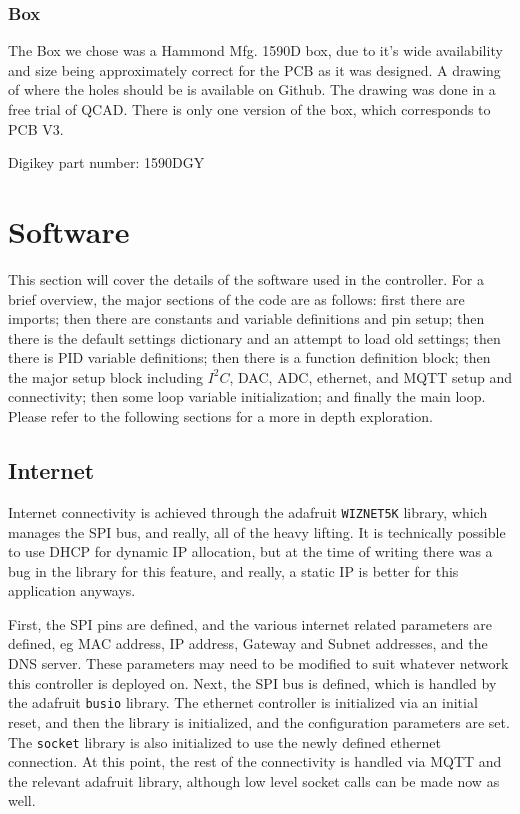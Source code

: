 \documentclass[11pt, letterpaper]{article}
\begin{document}
\subsubsection{Box}

The Box we chose was a Hammond Mfg. 1590D box, due to it's wide availability and size being approximately correct for the PCB as it was designed. A drawing of where the holes should be is available on Github. The drawing was done in a free trial of QCAD. There is only one version of the box, which corresponds to PCB V3.

Digikey part number: 1590DGY

\section{Software}
This section will cover the details of the software used in the controller. For a brief overview, the major sections of the code are as follows: first there are imports; then there are constants and variable definitions and pin setup; then there is the default settings dictionary and an attempt to load old settings; then there is PID variable definitions; then there is a function definition block; then the major setup block including $I^2 C$, DAC, ADC, ethernet, and MQTT setup and connectivity; then some loop variable initialization; and finally the main loop. Please refer to the following sections for a more in depth exploration.

\subsection{Internet}
Internet connectivity is achieved through the adafruit \verb|WIZNET5K| library, which manages the SPI bus, and really, all of the heavy lifting. It is technically possible to use DHCP for dynamic IP allocation, but at the time of writing there was a bug in the library for this feature, and really, a static IP is better for this application anyways.

First, the SPI pins are defined, and the various internet related parameters are defined, eg MAC address, IP address, Gateway and Subnet addresses, and the DNS server. These parameters may need to be modified to suit whatever network this controller is deployed on. Next, the SPI bus is defined, which is handled by the adafruit \verb|busio| library. The ethernet controller is initialized via an initial reset, and then the library is initialized, and the configuration parameters are set. The \verb|socket| library is also initialized to use the newly defined ethernet connection. At this point, the rest of the connectivity is handled via MQTT and the relevant adafruit library, although low level socket calls can be made now as well.
\end{document}
